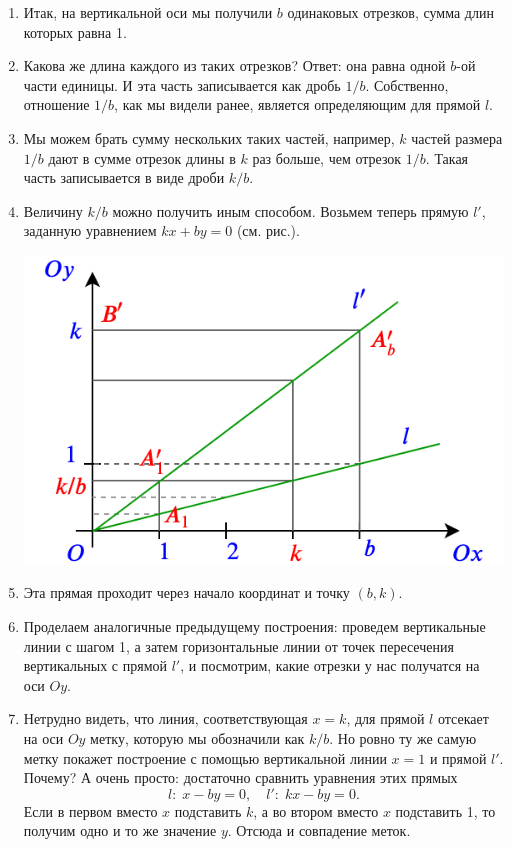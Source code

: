 \begin{enumerate}
\item Итак, на вертикальной оси мы получили $b$ одинаковых отрезков, сумма длин которых равна 1.
\item Какова же длина каждого из таких отрезков? Ответ: она равна одной $b$-ой части единицы. И эта часть записывается как дробь $1/b$. Собственно, отношение $1/b$, как мы видели ранее, является определяющим для прямой $l$.
\item Мы можем брать сумму нескольких таких частей, например, $k$ частей размера $1/b$ дают в сумме отрезок длины в $k$ раз больше, чем отрезок $1/b$. Такая часть записывается в виде дроби $k/b$.
\item Величину $k/b$ можно получить иным способом. Возьмем теперь прямую $l'$, заданную уравнением $kx+by=0$ (см. рис.).
\begin{center}
\includegraphics[scale=0.5]{sectionkb.png}
\end{center}
\item Эта прямая проходит через начало координат и точку $(b,k)$.
\item Проделаем аналогичные предыдущему построения: проведем вертикальные линии с шагом 1, а затем горизонтальные линии от точек пересечения вертикальных с прямой $l'$, и посмотрим, какие отрезки у нас получатся на оси $Oy$.
\item Нетрудно видеть, что линия, соответствующая $x=k$, для прямой $l$ отсекает на оси $Oy$ метку, которую мы обозначили как $k/b$. Но ровно ту же самую метку покажет построение с помощью вертикальной линии $x=1$ и прямой $l'$. Почему? А очень просто: достаточно сравнить уравнения этих прямых
$$
l:\;x-by=0,\quad l':\;kx-by=0.
$$
Если в первом вместо $x$ подставить $k$, а во втором вместо $x$ подставить 1, то получим одно и то же значение $y$. Отсюда и совпадение меток.

\end{enumerate}
